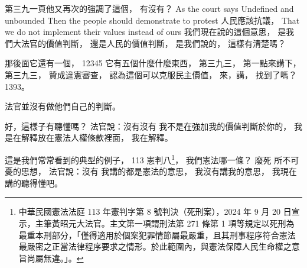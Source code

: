 \hypertarget{w06:cue:2778}{}第三九一頁他又再次的強調了這個，
\hypertarget{w06:cue:2779}{}有沒有？
\hypertarget{w06:cue:2780}{}As the court says
\hypertarget{w06:cue:2781}{}Undefined and unbounded
\hypertarget{w06:cue:2782}{}Then the people should demonstrate to protest
\hypertarget{w06:cue:2783}{}人民應該抗議，
\hypertarget{w06:cue:2784}{}That we do not implement their values instead of ours
\hypertarget{w06:cue:2785}{}我們現在說的這個意思，
\hypertarget{w06:cue:2786}{}是我們大法官的價值判斷，
\hypertarget{w06:cue:2787}{}還是人民的價值判斷，
\hypertarget{w06:cue:2788}{}是我們說的，
\hypertarget{w06:cue:2789}{}這樣有清楚嗎？

\hypertarget{w06:cue:2790}{}那後面它還有一個，
\hypertarget{w06:cue:2791}{}12345
\hypertarget{w06:cue:2792}{}它有五個什麼什麼東西，
\hypertarget{w06:cue:2793}{}第三九三，
\hypertarget{w06:cue:2794}{}第一點來講下，
\hypertarget{w06:cue:2795}{}第三九三，
\hypertarget{w06:cue:2796}{}贊成違憲審查，
\hypertarget{w06:cue:2797}{}認為這個可以克服民主價值，
\hypertarget{w06:cue:2798}{}來，講，
\hypertarget{w06:cue:2799}{}找到了嗎？1393。

\hypertarget{w06:cue:2800}{}法官並沒有做他們自己的判斷。

\hypertarget{w06:cue:2801}{}好，這樣子有聽懂嗎？
\hypertarget{w06:cue:2802}{}法官說：沒有沒有 我不是在強加我的價值判斷於你的，
\hypertarget{w06:cue:2803}{}我是在解釋放在憲法人權條款裡面，
\hypertarget{w06:cue:2804}{}我在解釋。

\hypertarget{w06:cue:2805}{}這是我們常常看到的典型的例子，
\hypertarget{w06:cue:2806}{}113 憲判八\footnote{中華民國憲法法庭 113 年憲判字第 8 號判決（死刑案），2024 年 9 月 20 日宣示，主筆黃昭元大法官。主文第一項謂刑法第 271 條第 1 項等規定以死刑為最重本刑部分，「僅得適用於個案犯罪情節屬最嚴重，且其刑事程序符合憲法最嚴密之正當法律程序要求之情形。於此範圍內，與憲法保障人民生命權之意旨尚屬無違。」\cite{ccj113-8}。}，
\hypertarget{w06:cue:2807}{}我們憲法哪一條？
\hypertarget{w06:cue:2808}{}廢死 所不可憂的思想，
\hypertarget{w06:cue:2809}{}法官說：沒有 我講的都是憲法的意思，
\hypertarget{w06:cue:2810}{}我沒有講我的意思，
\hypertarget{w06:cue:2811}{}我現在講的聽得懂吧。

